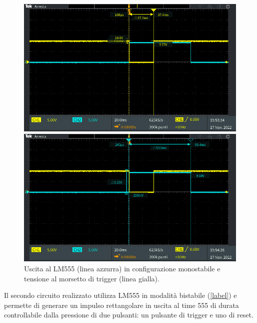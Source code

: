 \begin{figure}[tbh]
	\centering
	\begin{minipage}{.496\textwidth}
		\includegraphics[width=\linewidth]{./ImageFiles/Laboratorio 5/TEK00005.PNG}
	\end{minipage}
	\begin{minipage}{.496\textwidth}
		\includegraphics[width=\linewidth]{./ImageFiles/Laboratorio 5/TEK00006.PNG}
	\end{minipage}
	\caption{Uscita al LM555 (linea azzurra) in configurazione monostabile e tensione al morsetto di trigger (linea gialla).}
	\label{fig:circuito_1_scope}
\end{figure}



\clearpage
Il secondo circuito realizzato utilizza LM555 in modalità bistabile (\Fig\ref{label}) e permette di generare un impulso rettangolare in uscita al time 555 di durata controllabile dalla pressione di due pulsanti: un pulsante di trigger e uno di reset. 

